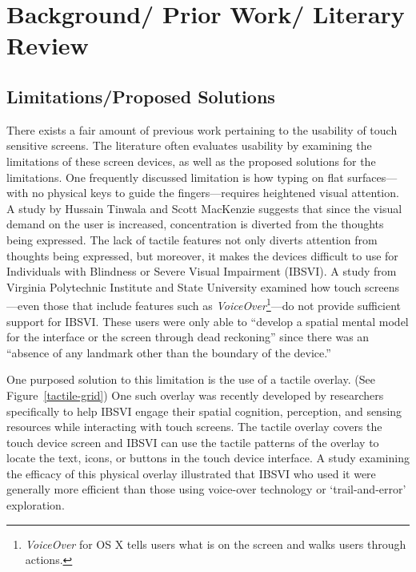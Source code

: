 \documentclass[11pt]{article}
\begin{document}
\section{Background/ Prior Work/ Literary Review}
\label{background}
\subsection{Limitations/Proposed Solutions}
There exists a fair amount of previous work pertaining to the usability of touch sensitive screens. The literature often evaluates usability by examining the limitations of these screen devices, as well as the proposed solutions for the limitations. One frequently discussed limitation is how typing on flat surfaces---with no physical keys to guide the fingers---requires heightened visual attention. A study by Hussain Tinwala and Scott MacKenzie suggests that since the visual demand on the user is increased, concentration is diverted from the thoughts being expressed. \cite{Tinwala:2010:ETE:1868914.1868972} The lack of tactile features not only diverts attention from thoughts being expressed, but moreover, it makes the devices difficult to use for Individuals with Blindness or Severe Visual Impairment (IBSVI). A study from Virginia Polytechnic Institute and State University examined how touch screens---even those that include features such as  \textit{VoiceOver}\footnote{\textit{VoiceOver} for OS X tells users what is on the screen and walks users through actions.\cite{VoiceOver}}---do not provide sufficient support for IBSVI. These users were only able to ``develop a spatial mental model for the interface or the screen through dead reckoning'' since there was an ``absence of any landmark other than the boundary of the device.'' \cite{El-Glaly:2013:TTF:2460625.2460665} 

One purposed solution to this limitation is the use of a tactile overlay. (See Figure~\ref{tactile-grid}) One such overlay was recently developed by researchers specifically to help IBSVI engage their spatial cognition, perception, and sensing resources while interacting with touch screens.  \cite{El-Glaly:2013:TTF:2460625.2460665} The tactile overlay covers the touch device screen and IBSVI can use the tactile patterns of the overlay to locate the text, icons, or buttons in the touch device interface. A study examining the efficacy of this physical overlay illustrated that IBSVI who used it were generally more efficient than those using voice-over technology or `trail-and-error' exploration. \cite{El-Glaly:2013:TTF:2460625.2460665}
\end{document}
